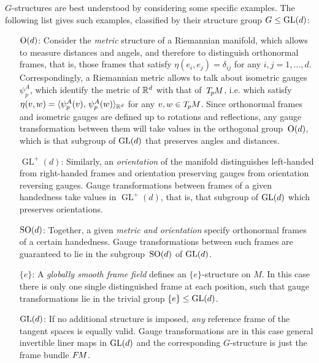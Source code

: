 $G$-structures are best understood by considering some specific examples.
The following list gives such examples, classified by their structure group $G \leq \operatorname{GL}(d)$:
\begin{itemize}[leftmargin=9.4ex]
    \item[$\operatorname{O}(d)$:]
        Consider the \emph{metric} structure of a Riemannian manifold, which allows to measure distances and angels, and therefore to distinguish orthonormal frames, that is, those frames that satisfy $\eta(e_i,e_j) = \delta_{ij}$ for any $i,j=1,\dots,d$.
        Correspondingly, a Riemannian metric allows to talk about isometric gauges $\psi_p^A$, which identify the metric of $\mathbb{R}^d$ with that of~$T_{\mkern-1.5mu p}\mkern-.5muM$, i.e. which satisfy $\eta(v,w) = \langle \psi_p^A(v),\, \psi_p^A(w) \rangle_{\mathbb{R}^d}$ for any $v,w \in T_{\mkern-1.5mu p}\mkern-.5muM$.
        Since orthonormal frames and isometric gauges are defined up to rotations and reflections, any gauge transformation between them will take values in the orthogonal group~$\operatorname{O}(d)$, which is that subgroup of $\operatorname{GL}(d)$ that preserves angles and distances.
    \item[$\operatorname{GL}^+(d)$:]
        Similarly, an \emph{orientation} of the manifold distinguishes left-handed from right-handed frames and orientation preserving gauges from orientation reversing gauges.
        Gauge transformations between frames of a given handedness take values in $\operatorname{GL}^+(d)$, that is, that subgroup of $\operatorname{GL}(d)$ which preserves orientations.
    \item[$\operatorname{SO}(d)$:]
        Together, a given \emph{metric and orientation} specify orthonormal frames of a certain handedness.
        Gauge transformations between such frames are guaranteed to lie in the subgroup~$\operatorname{SO}(d)$ of $\operatorname{GL}(d)$.
    \item[$\{e\}$:]
        A \emph{globally smooth frame field} defines an $\{e\}$-structure on $M$.
        In this case there is only one single distinguished frame at each position, such that gauge transformations lie in the trivial group ${\{e\} \leq \operatorname{GL}(d)}$.
    \item[$\operatorname{GL}(d)$:]
        If no additional structure is imposed, \emph{any} reference frame of the tangent spaces is equally valid.
        Gauge transformations are in this case general invertible liner maps in $\operatorname{GL}(d)$ and the corresponding $G$-structure is just the frame bundle $F\mkern-1.5muM$.
\end{itemize}


